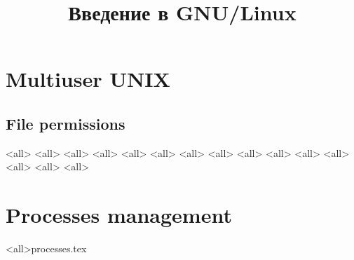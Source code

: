 

\title{Введение в GNU/Linux}





\begin{frame}
	\frametitle{}
	\titlepage
	\vspace{-0.5cm}
	\begin{center}
	\end{center}
\end{frame}



\section{Multiuser UNIX}
\subsection{File permissions}
\mode<all>{}
\mode<all>{}
\mode<all>{}
\mode<all>{}
\mode<all>{}
\mode<all>{}
\mode<all>{}
\mode<all>{}
\mode<all>{}
\mode<all>{}
\mode<all>{}
\mode<all>{}
\mode<all>{}
\mode<all>{}
\mode<all>{}
\section{Processes management}
\mode<all>{{processes.tex}}
